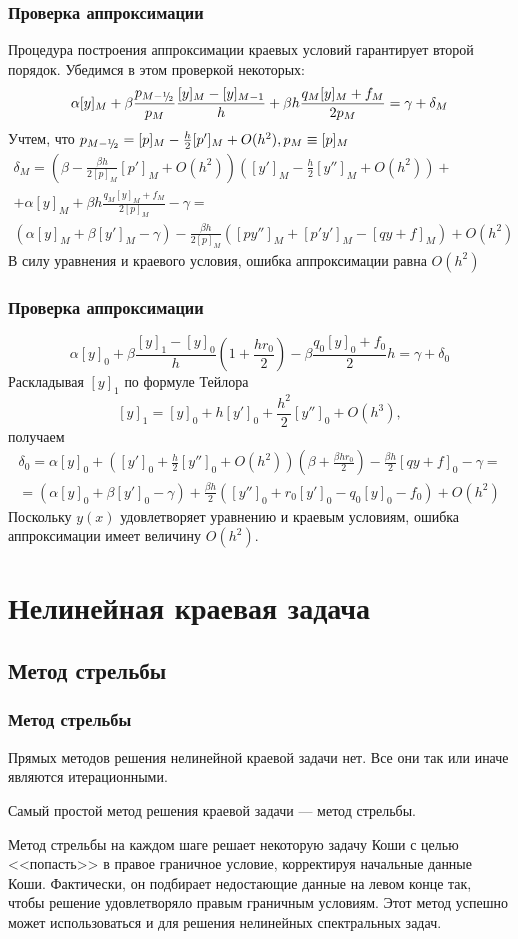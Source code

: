\documentclass[professionalfonts,compress,unicode,aspectratio=169]{beamer}
\newcommand{\cutefrac}[2]{{}^{#1}\mkern-5mu/{\!}_#2}
\newcommand{\half}{{\cutefrac{1}{2}}}
\begin{document}
\begin{frame}\frametitle{Проверка аппроксимации}
	Процедура построения аппроксимации краевых условий гарантирует второй
	порядок. Убедимся в этом проверкой некоторых:
	\[
	\alpha [y]_M + \beta \frac{p_{M-\half}}{p_M} \frac{[y]_M - [y]_{M-1}}{h} +
	\beta h \frac{q_M [y]_M + f_M}{2p_M} = \gamma + \delta_M
	\]
	Учтем, что $p_{M-\half} = [p]_M - \frac{h}{2}[p']_{M} + O(h^2), p_M \equiv
	[p]_M$
	\begin{gather*}
	\delta_M = \left(\beta - \frac{\beta h}{2[p]_M}[p']_M + O(h^2)\right)
	\left([y']_M - \frac{h}{2}[y'']_M + O(h^2)\right) +\\
	+\alpha [y]_M + \beta h \frac{q_M [y]_M + f_M}{2[p]_M} - \gamma = \\
	\left(\alpha [y]_M + \beta [y']_M - \gamma\right) 
	- \frac{\beta h}{2 [p]_M} \left(
	[py'']_M + [p'y']_M - [qy+f]_M
	\right) + O(h^2)
	\end{gather*}
	В силу уравнения и краевого условия, ошибка аппроксимации равна $O(h^2)$
\end{frame}

\begin{frame}\frametitle{Проверка аппроксимации}
	\[
	\alpha [y]_0 + \beta
	\frac{[y]_1 - [y]_0}{h}\left(1 + \frac{h r_0}{2}\right) - \beta \frac{q_0 [y]_0 +
	f_0}{2}h = \gamma + \delta_0
	\]
	Раскладывая $[y]_1$ по формуле Тейлора \[[y]_1 = [y]_0 + h [y']_0 +
	\frac{h^2}{2} [y'']_0 + O (h^3),\]получаем
	\begin{gather*}
	\delta_0 = \alpha [y]_0 +  \left([y']_0 + \frac{h}{2}[y'']_0 + O(h^2)\right)
	\left(\beta + \frac{\beta hr_0}{2}\right) - \frac{\beta h}{2} [q y + f]_0 -
	\gamma = \\
	= \left(\alpha [y]_0 + \beta [y']_0 - \gamma \right) 
	+ \frac{\beta h}{2} \left(
	[y'']_0 + r_0 [y']_0 - q_0 [y]_0 - f_0
	\right) + O(h^2)
	\end{gather*}
	Поскольку $y(x)$ удовлетворяет уравнению и краевым условиям, ошибка
	аппроксимации имеет величину $O(h^2)$.
\end{frame}

\section{Нелинейная краевая задача}
\subsection{Метод стрельбы}
\begin{frame}\frametitle{Метод стрельбы}
	Прямых методов решения нелинейной краевой задачи нет. Все они так или иначе
	являются итерационными.

	Самый простой метод решения краевой задачи --- метод стрельбы.

	Метод стрельбы на каждом шаге решает некоторую задачу Коши с целью
	<<попасть>>
	в правое граничное условие, корректируя начальные данные Коши. Фактически,
	он подбирает недостающие данные на левом конце так, чтобы решение
	удовлетворяло правым граничным условиям. Этот метод успешно может
	использоваться и для решения нелинейных спектральных задач.
\end{frame}
\end{document}
